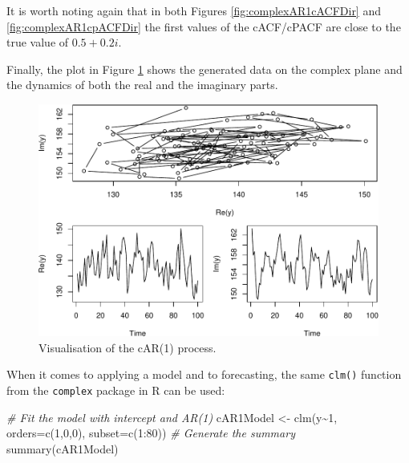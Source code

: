 \documentclass[
]{book}
\newenvironment{Shaded}{\begin{snugshade}}{\end{snugshade}}
\newcommand{\AttributeTok}[1]{\textcolor[rgb]{0.77,0.63,0.00}{#1}}
\newcommand{\CommentTok}[1]{\textcolor[rgb]{0.56,0.35,0.01}{\textit{#1}}}
\newcommand{\DecValTok}[1]{\textcolor[rgb]{0.00,0.00,0.81}{#1}}
\newcommand{\FunctionTok}[1]{\textcolor[rgb]{0.00,0.00,0.00}{#1}}
\newcommand{\NormalTok}[1]{#1}
\newcommand{\OtherTok}[1]{\textcolor[rgb]{0.56,0.35,0.01}{#1}}
\newcommand{\SpecialCharTok}[1]{\textcolor[rgb]{0.00,0.00,0.00}{#1}}
\begin{document}
It is worth noting again that in both Figures \ref{fig:complexAR1cACFDir} and \ref{fig:complexAR1cpACFDir} the first values of the cACF/cPACF are close to the true value of \(0.5+0.2i\).

Finally, the plot in Figure \ref{fig:complexAR1Plot} shows the generated data on the complex plane and the dynamics of both the real and the imaginary parts.

\begin{figure}
\centering
\includegraphics{Svetunkov---Svetunkov---Complex-Valued-Econometrics_files/figure-latex/complexAR1Plot-1.pdf}
\caption{\label{fig:complexAR1Plot}Visualisation of the cAR(1) process.}
\end{figure}

When it comes to applying a model and to forecasting, the same \texttt{clm()} function from the \texttt{complex} package in R can be used:

\begin{Shaded}
\begin{Highlighting}[]
\CommentTok{\# Fit the model with intercept and AR(1)}
\NormalTok{cAR1Model }\OtherTok{\textless{}{-}} \FunctionTok{clm}\NormalTok{(y}\SpecialCharTok{\textasciitilde{}}\DecValTok{1}\NormalTok{, }\AttributeTok{orders=}\FunctionTok{c}\NormalTok{(}\DecValTok{1}\NormalTok{,}\DecValTok{0}\NormalTok{,}\DecValTok{0}\NormalTok{), }\AttributeTok{subset=}\FunctionTok{c}\NormalTok{(}\DecValTok{1}\SpecialCharTok{:}\DecValTok{80}\NormalTok{))}
\CommentTok{\# Generate the summary}
\FunctionTok{summary}\NormalTok{(cAR1Model)}
\end{Highlighting}
\end{Shaded}
\end{document}
